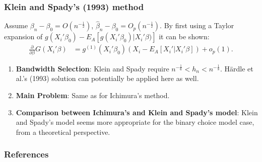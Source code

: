 \documentclass[11pt]{beamer}
\begin{document}
\begin{frame}[t]
    \frametitle{Klein and Spady's (1993) method}
Assume $\beta_n - \beta_0 = O(n^{-\frac{1}{2}})$, $\hat{\beta}_n - \beta_0 = O_p(n^{-\frac{1}{2}})$. By first using a Taylor expansion of $g(X_i'\beta_0) - E_A[g(X_i'\beta_0)|X_i'\beta)]$ it can be shown:
\begin{align*}
 \frac{\partial}{\partial \beta} G(X_i'\beta) & = 
 										 g^{(1)}(X_i'\beta_0)( X_i - E_A[X_i'|X_i'\beta]) + o_p(1).
\end{align*}
\begin{enumerate}
	\item \textbf{Bandwidth Selection}: Klein and Spady require $ n^{-\frac{1}{6}} < h_n < n^{-\frac{1}{8}}$. H{\"a}rdle et al.'s (1993) solution can potentially be applied here as well.
	\item \textbf{Main Problem}: Same as for Ichimura's method.
	\item \textbf{Comparison between Ichimura's and Klein and Spady's model}:
	Klein and Spady's model seems more appropriate for the binary choice model case, from a theoretical perspective.
\end{enumerate}
\end{frame}
 {
    \begin{frame}
        \frametitle{}
    \end{frame}

}

\begin{frame}[allowframebreaks]
    \frametitle{References}
    \renewcommand{\bibfont}{\normalfont\footnotesize}
    \printbibliography
\end{frame}
\end{document}
